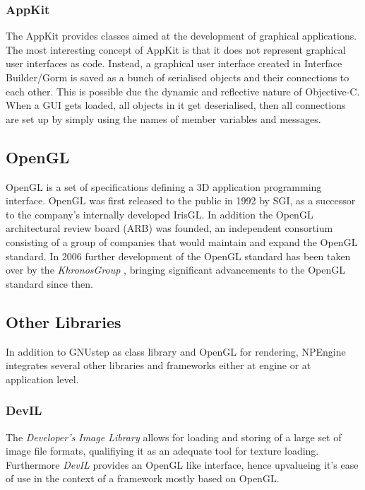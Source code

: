 \subsubsection{AppKit}

The AppKit provides classes aimed at the development of graphical applications.
The most interesting concept of AppKit is that it does not represent graphical
user interfaces as code. Instead, a graphical user interface created in
Interface Builder/Gorm is saved as a bunch of serialised objects and their
connections to each other. This is possible due the dynamic and reflective
nature of Objective-C. When a GUI gets loaded, all objects in it get
deserialised, then all connections are set up by simply using the names of
member variables and messages. 

\subsection{OpenGL}
OpenGL is a set of specifications defining a 3D application programming
interface. OpenGL was first released to the public in 1992 by SGI, as a
successor to the company's internally developed IrisGL. In addition the OpenGL
architectural review board (ARB)\cite{misc:opengl-arb} was founded, an
independent consortium consisting of a group of companies that would maintain
and expand the OpenGL standard. In 2006 further development of the OpenGL
standard has been taken over by the \textit{KhronosGroup}
\cite{misc:opengl-khronos}, bringing significant advancements to the OpenGL
standard since then. 

\subsection{Other Libraries}

In addition to GNUstep as class library and OpenGL for rendering, NPEngine
integrates several other libraries and frameworks either at engine or at
application level.

\subsubsection{DevIL}

The \textit{Developer's Image Library}\cite{misc:devil} allows for loading and
storing of a large set of image file formats, qualifiying it as an adequate
tool for texture loading. Furthermore \textit{DevIL} provides an OpenGL like
interface, hence upvalueing it's ease of use in the context of a framework
mostly based on OpenGL.

